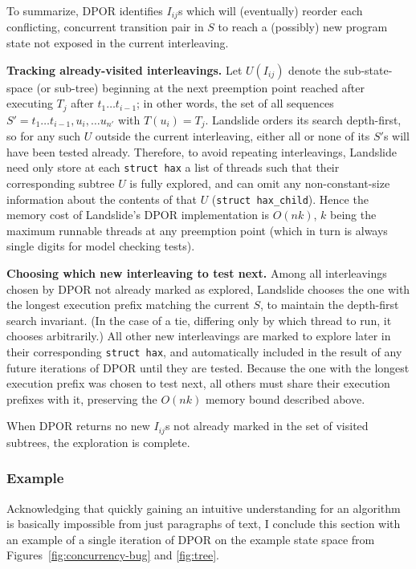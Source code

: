 To summarize, %
DPOR identifies $I_{ij}$s which will (eventually) reorder each conflicting, concurrent transition pair in $S$
to reach a (possibly) new program state not exposed in the current interleaving.

{\bf Tracking already-visited interleavings.}
Let $U(I_{ij})$ denote the sub-state-space (or sub-tree) beginning at the next preemption point reached
after executing $T_j$ after $t_1 \dots t_{i-1}$;
in other words, the set of all sequences $S' = t_1 \dots t_{i-1}, u_i, \dots u_{n'}$ with $T(u_i) = T_j$.
Landslide orders its search depth-first,
so for any such $U$ outside the current interleaving,
either all or none of its $S'$s will have been tested already.
Therefore, to avoid repeating interleavings,
Landslide need only store at each {\tt struct hax} a list of threads
such that their corresponding subtree $U$ is fully explored,
and can omit any non-constant-size information about the contents of that $U$
({\tt struct hax\_child}).
Hence the memory cost of Landslide's DPOR implementation is $O(nk)$,
$k$ being the maximum runnable threads at any preemption point
(which in turn is always single digits for model checking tests).

{\bf Choosing which new interleaving to test next.}
Among all interleavings chosen by DPOR not already marked as explored,
Landslide chooses the one with the longest execution prefix matching the current $S$,
to maintain the depth-first search invariant.
(In the case of a tie, differing only by which thread to run, it chooses arbitrarily.)
All other new interleavings are marked to explore later in their corresponding {\tt struct hax},
and automatically included in the result of any future iterations of DPOR until they are tested.
Because the one with the longest execution prefix was chosen to test next,
all others must share their execution prefixes with it,
preserving the $O(nk)$ memory bound described above.

When DPOR returns no new $I_{ij}$s not already marked in the set of visited subtrees,
the exploration is complete.

\subsubsection{Example}

Acknowledging that quickly gaining an intuitive understanding for an algorithm
is basically impossible from just paragraphs of text,
I conclude this section with an example of a single iteration of DPOR
on the example state space from Figures~\ref{fig:concurrency-bug} and \ref{fig:tree}.

